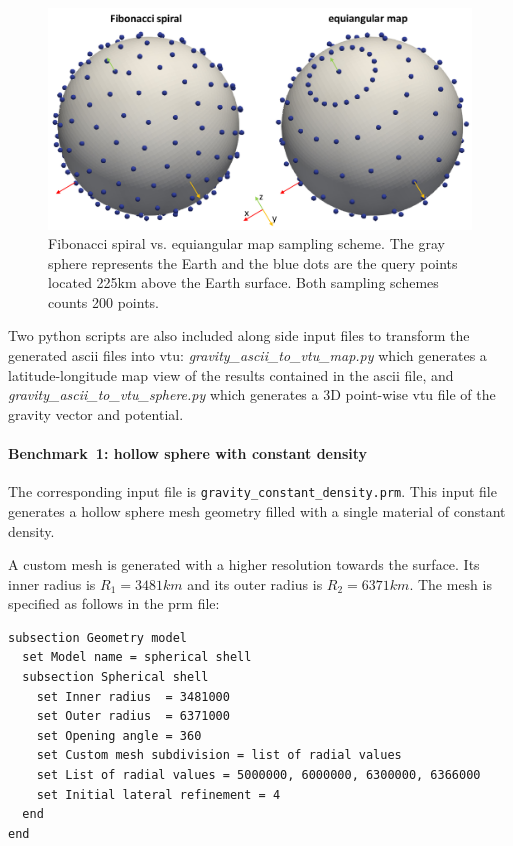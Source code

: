 \begin{figure}[h!]
\centering
\includegraphics[scale=0.75]{../../benchmarks/gravity_prem/doc/spiral_VS_map_sampling.jpg}
\caption{Fibonacci spiral vs. equiangular map sampling scheme. The gray sphere represents the Earth and the blue dots are the query points located 225\si{km} above the Earth surface. Both sampling schemes counts 200 points.}
\label{fig:gravityspiral}
\end{figure}

Two python scripts are also included along side input files to transform the generated ascii files into vtu:
{\sl gravity\_ascii\_to\_vtu\_map.py} which generates a latitude-longitude map view of the results contained in the ascii file, and {\sl gravity\_ascii\_to\_vtu\_sphere.py}
which generates a 3D point-wise vtu file of the gravity vector and potential.


\paragraph{Benchmark~1: hollow sphere with constant density}
\hfill \break
The corresponding input file is \texttt{gravity\_constant\_density.prm}.
This input file generates a hollow sphere mesh geometry filled with a single material of constant density.  

A custom mesh is generated with a higher resolution towards the surface. Its inner radius is $R_1=3481 \si{km}$ and its outer radius is $R_2=6371 \si{km}$. The mesh is specified as follows in the prm file:

\begin{lstlisting}
subsection Geometry model
  set Model name = spherical shell
  subsection Spherical shell
    set Inner radius  = 3481000
    set Outer radius  = 6371000
    set Opening angle = 360
    set Custom mesh subdivision = list of radial values
    set List of radial values = 5000000, 6000000, 6300000, 6366000
    set Initial lateral refinement = 4
  end
end
\end{lstlisting}

